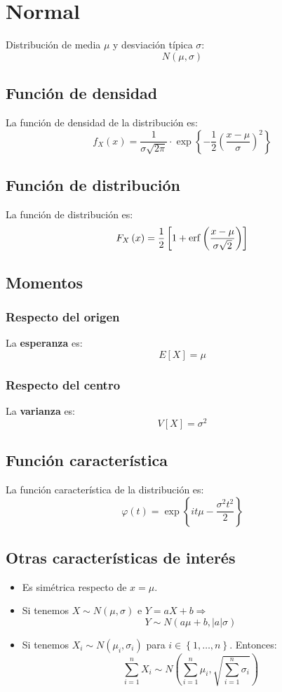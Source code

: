 \section{Normal}
\label{sec:normal}
Distribución de media $\mu$ y desviación típica $\sigma$:
\[
\boxed{N\left( \mu, \sigma \right)}
\]

\subsection{Función de densidad}
La función de densidad de la distribución es:
\[
f_X \left( x \right) = \frac{1}{\sigma \sqrt{2 \pi}} \cdot \exp\left\{ -\frac{1}{2} \left( \frac{x - \mu}{\sigma} \right)^2 \right\}
\]

\subsection{Función de distribución}
La función de distribución es:
\[
F_X\left( x \right) = \frac{1}{2} \left[ 1 + \operatorname{erf}\left( \frac{x - \mu}{\sigma \sqrt{2}} \right) \right]
\]

\subsection{Momentos}

\subsubsection*{Respecto del origen}
La \textbf{esperanza} es: 
\[
    E\left[ X \right] = \mu
\]
\subsubsection*{Respecto del centro}
La \textbf{varianza} es:
\[
    V\left[ X \right] = \sigma^2
\]

\subsection{Función característica}
La función característica de la distribución es:
\[
\varphi\left( t \right) = \exp\left\{ it \mu - \frac{\sigma^2 t^2}{2} \right\}
\]

\subsection{Otras características de interés}
\begin{itemize}
    \item Es simétrica respecto de $x = \mu$.
    \item Si tenemos $X \sim N\left( \mu, \sigma \right)$ e $Y = aX + b \Rightarrow$
    \[
    Y \sim N\left( a \mu + b, \lvert a \rvert \sigma \right)
    \]
    \item Si tenemos $X_i \sim N\left( \mu_i, \sigma_i \right)$ para $i \in \left\{ 1, \ldots, n \right\}$. Entonces: 
    \[
    \sum_{i=1}^{n} X_i \sim N\left( \sum_{i=1}^{n} \mu_i, \sqrt{\sum_{i=1}^{n} \sigma_i} \right)  
    \]
\end{itemize}
